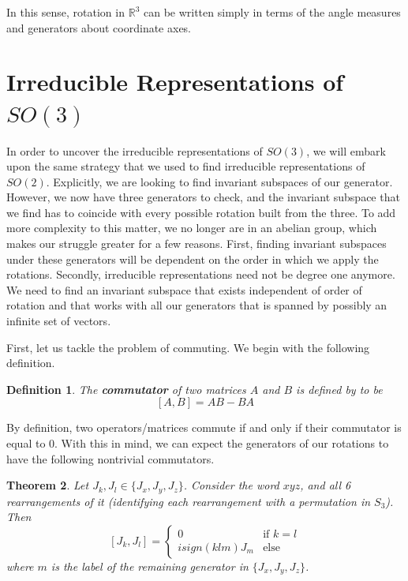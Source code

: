 \documentclass[10pt]{ucthesis}
\newcommand{\R}{\mathbb{R}}
\newtheorem{definition}{Definition}[chapter]
\newtheorem{theorem}[definition]{Theorem}
\begin{document}
In this sense, rotation in $\R^3$ can be written simply in terms of the angle measures and generators about coordinate axes.

\section{Irreducible Representations of $SO(3)$}

In order to uncover the irreducible representations of $SO(3)$, we will embark upon the same strategy that we used to find irreducible representations of $SO(2)$. Explicitly, we are looking to find invariant subspaces of our generator. However, we now have three generators to check, and the invariant subspace that we find has to coincide with every possible rotation built from the three. To add more complexity to this matter, we no longer are in an abelian group, which makes our struggle greater for a few reasons. First, finding invariant subspaces under these generators will be dependent on the order in which we apply the rotations. Secondly, irreducible representations need not be degree one anymore. We need to find an invariant subspace that exists independent of order of rotation and that works with all our generators that is spanned by possibly an infinite set of vectors.

First, let us tackle the problem of commuting. We begin with the following definition.

\begin{definition}
	The \textbf{commutator} of two matrices $A$ and $B$ is defined by to be 
$$[A,B]=AB-BA$$
\end{definition}

By definition, two operators/matrices commute if and only if their commutator is equal to $0$. With this in mind, we can expect the generators of our rotations to have the following nontrivial commutators.

\begin{theorem}
	Let $J_k,J_l \in \{J_x,J_y,J_z\}$. Consider the word $xyz$, and all 6 rearrangements of it (identifying each rearrangement with a permutation in $S_3$). Then 
$$[J_k , J_l] = \begin{cases}
					0 & \text{if }k = l \\
					isign(klm)J_m& \text{else}
					\end{cases}$$
where $m$ is the label of the remaining generator in $\{J_x,J_y,J_z\}$.
\end{theorem}
\end{document}
